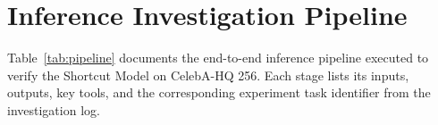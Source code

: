 
\section{Inference Investigation Pipeline}
\label{appendix:pipeline}

Table~\ref{tab:pipeline} documents the end-to-end inference pipeline
executed to verify the Shortcut Model on CelebA-HQ 256.
Each stage lists its inputs, outputs, key tools, and the corresponding
experiment task identifier from the investigation log.

